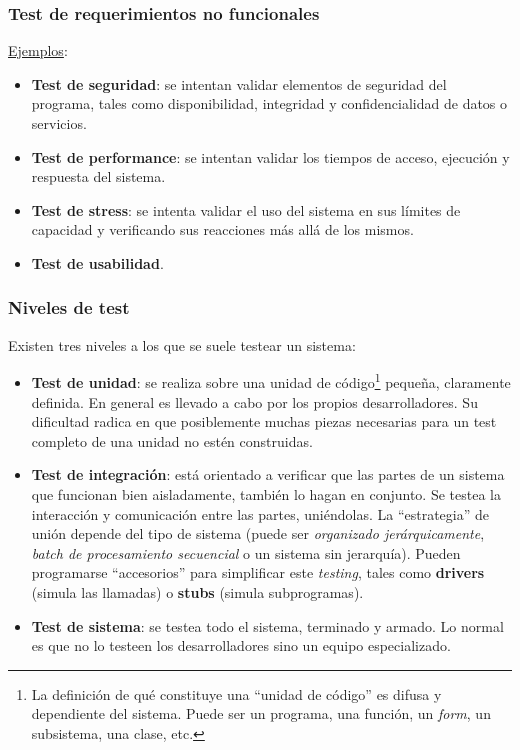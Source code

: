 \documentclass[]{article}
\begin{document}
\subsubsection{Test de requerimientos no funcionales}
\underline{Ejemplos}:
\begin{itemize}
	\item \textbf{Test de seguridad}: se intentan validar elementos de seguridad del programa, tales como disponibilidad, integridad y confidencialidad de datos o servicios.
	\item \textbf{Test de performance}: se intentan validar los tiempos de acceso, ejecución y respuesta del sistema.
	\item \textbf{Test de stress}: se intenta validar el uso del sistema en sus límites de capacidad y verificando sus reacciones más allá de los mismos.
	\item \textbf{Test de usabilidad}.
\end{itemize}

\subsubsection{Niveles de test}
Existen tres niveles a los que se suele testear un sistema:
\begin{itemize}
	\item \textbf{Test de unidad}: se realiza sobre una unidad de código\footnote{La definición de qué constituye una ``unidad de código'' es difusa y dependiente del sistema. Puede ser un programa, una función, un \textit{form}, un subsistema, una clase, etc.} pequeña, claramente definida. En general es llevado a cabo por los propios desarrolladores. Su dificultad radica en que posiblemente muchas piezas necesarias para un test completo de una unidad no estén construidas.
	\item \textbf{Test de integración}: está orientado a verificar que las partes de un sistema que funcionan bien aisladamente, también lo hagan en conjunto. Se testea la interacción y comunicación entre las partes, uniéndolas. La ``estrategia'' de unión depende del tipo de sistema (puede ser \textit{organizado jerárquicamente}, \textit{batch de procesamiento secuencial} o un sistema sin jerarquía). Pueden programarse ``accesorios'' para simplificar este \textit{testing}, tales como \textbf{drivers} (simula las llamadas) o \textbf{stubs} (simula subprogramas).
	\item \textbf{Test de sistema}: se testea todo el sistema, terminado y armado. Lo normal es que no lo testeen los desarrolladores sino un equipo especializado.
\end{itemize}
\end{document}
